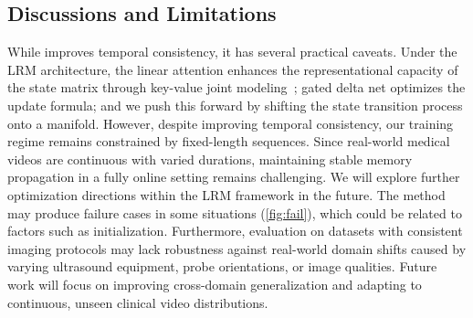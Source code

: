 \subsection{Discussions and Limitations}
    \label{subsec:discussion}

\noindent
While \mymodel improves temporal consistency, it has several practical caveats.
Under the LRM architecture, the linear attention enhances the representational capacity of the state matrix through key-value joint modeling~\cite{katharopoulos_transformers_2020}; gated delta net \cite{JPA88_sinnm,EL89_nncudr,nc92_schmidhuber,ICLR25_gdn,ICCV25_gdkvm,arxiv25_kimidelta} optimizes the update formula; and we push this forward by shifting the state transition process onto a manifold.
However, despite improving temporal consistency, our training regime remains constrained by fixed-length sequences.
Since real-world medical videos are continuous with varied durations, maintaining stable memory propagation in a fully online setting remains challenging.
We will explore further optimization directions within the LRM framework in the future.
The method may produce failure cases in some situations (\cref{fig:fail}), which could be related to factors such as initialization.
Furthermore, evaluation on datasets with consistent imaging protocols may lack robustness against real-world domain shifts caused by varying ultrasound equipment, probe orientations, or image qualities.
Future work will focus on improving cross-domain generalization and adapting to continuous, unseen clinical video distributions.